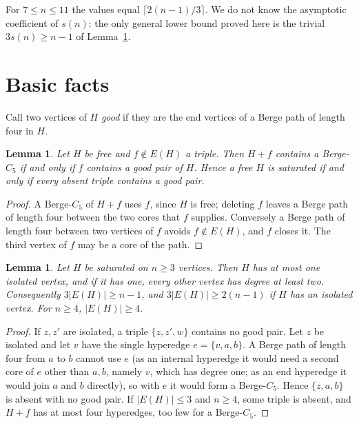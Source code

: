 \documentclass[11pt]{article}
\newtheorem{lemma}[theorem]{Lemma}
\theoremstyle{remark}
\begin{document}
For $7\le n\le11$ the values equal $\lceil2(n-1)/3\rceil$. We do not know
the asymptotic coefficient of $s(n)$: the only general lower bound proved
here is the trivial $3s(n)\ge n-1$ of Lemma~\ref{lem:basic}.

\section{Basic facts}\label{sec:basic}

Call two vertices of $H$ \emph{good} if they are the end vertices of a
Berge path of length four in $H$.

\begin{lemma}\label{lem:closing}
Let $H$ be free and $f\notin E(H)$ a triple. Then $H+f$ contains a
Berge-$C_5$ if and only if $f$ contains a good pair of $H$. Hence a free
$H$ is saturated if and only if every absent triple contains a good pair.
\end{lemma}

\begin{proof}
A Berge-$C_5$ of $H+f$ uses $f$, since $H$ is free; deleting $f$ leaves a
Berge path of length four between the two cores that $f$ supplies.
Conversely a Berge path of length four between two vertices of $f$ avoids
$f\notin E(H)$, and $f$ closes it. The third vertex of $f$ may be a core of
the path.
\end{proof}

\begin{lemma}\label{lem:basic}
Let $H$ be saturated on $n\ge3$ vertices. Then $H$ has at most one
isolated vertex, and if it has one, every other vertex has degree at least
two. Consequently $3|E(H)|\ge n-1$, and $3|E(H)|\ge2(n-1)$ if $H$ has an
isolated vertex. For $n\ge4$, $|E(H)|\ge4$.
\end{lemma}

\begin{proof}
If $z,z'$ are isolated, a triple $\{z,z',w\}$ contains no good pair. Let
$z$ be isolated and let $v$ have the single hyperedge $e=\{v,a,b\}$. A
Berge path of length four from $a$ to $b$ cannot use $e$ (as an internal
hyperedge it would need a second core of $e$ other than $a,b$, namely $v$,
which has degree one; as an end hyperedge it would join $a$ and $b$
directly), so with $e$ it would form a Berge-$C_5$. Hence $\{z,a,b\}$ is
absent with no good pair. If $|E(H)|\le3$ and $n\ge4$, some triple is
absent, and $H+f$ has at most four hyperedges, too few for a Berge-$C_5$.
\end{proof}
\end{document}
